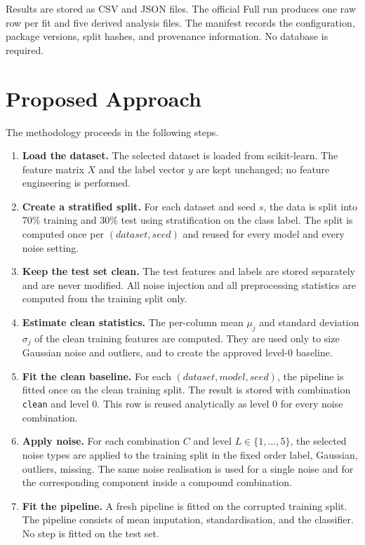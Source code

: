 Results are stored as CSV and JSON files. The official Full run produces one raw row per fit and five derived analysis files. The manifest records the configuration, package versions, split hashes, and provenance information. No database is required.

\section{Proposed Approach}

The methodology proceeds in the following steps.

\begin{enumerate}
  \item \textbf{Load the dataset.} The selected dataset is loaded from scikit-learn. The feature matrix $X$ and the label vector $y$ are kept unchanged; no feature engineering is performed.
  \item \textbf{Create a stratified split.} For each dataset and seed $s$, the data is split into 70\% training and 30\% test using stratification on the class label. The split is computed once per $(dataset, seed)$ and reused for every model and every noise setting.
  \item \textbf{Keep the test set clean.} The test features and labels are stored separately and are never modified. All noise injection and all preprocessing statistics are computed from the training split only.
  \item \textbf{Estimate clean statistics.} The per-column mean $\mu_j$ and standard deviation $\sigma_j$ of the clean training features are computed. They are used only to size Gaussian noise and outliers, and to create the approved level-0 baseline.
  \item \textbf{Fit the clean baseline.} For each $(dataset, model, seed)$, the pipeline is fitted once on the clean training split. The result is stored with combination \texttt{clean} and level 0. This row is reused analytically as level 0 for every noise combination.
  \item \textbf{Apply noise.} For each combination $C$ and level $L \in \{1,\ldots,5\}$, the selected noise types are applied to the training split in the fixed order label, Gaussian, outliers, missing. The same noise realisation is used for a single noise and for the corresponding component inside a compound combination.
  \item \textbf{Fit the pipeline.} A fresh pipeline is fitted on the corrupted training split. The pipeline consists of mean imputation, standardisation, and the classifier. No step is fitted on the test set.

\end{enumerate}
